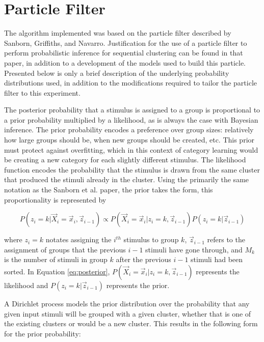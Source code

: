 \section*{Particle Filter}
The algorithm implemented was based on the particle filter described by Sanborn,
Griffiths, and Navarro\cite{sanborn2010}. Justification for the use of a
particle filter to perform probabilistic inference for sequential clustering can
be found in that paper, in addition to a development of the models used to build
this particle. Presented below is only a brief description of the underlying
probability distributions used, in addition to the modifications required to
tailor the particle filter to this experiment.

The posterior probability that a stimulus is assigned to a group is proportional
to a prior probability multiplied by a likelihood, as is always the case with
Bayesian inference. The prior probability encodes a preference over group sizes:
relatively how large groups should be, when new groups should be created, etc.
This prior must protect against overfitting, which in this context of category
learning would be creating a new category for each slightly different stimulus.
The likelihood function encodes the probability that the stimulus is drawn from
the same cluster that produced the stimuli already in the cluster. Using the
primarily the same notation as the Sanborn et al. paper, the prior takes the
form, this proportionality is represented by

\begin{equation}
P(z_i = k | \vec{X}_i = \vec{x}_i,  \vec{z}_{i-1}) \propto  P(\vec{X}_i =
\vec{x}_i | z_i = k,  \vec{z}_{i-1}) P(z_i = k | \vec{z}_{i-1})
\label{eq:posterior}
\end{equation}

where $z_i = k$ notates assigning the $i^{th}$ stimulus to group $k$, $\vec{z}_{i-1}$ refers to
the assignment of groups that the previous $i - 1$ stimuli have gone through,
and $M_k$ is the number of stimuli in group $k$ after the previous $i - 1$
stimuli had been sorted. In Equation \ref{eq:posterior}, $P(\vec{X}_i =
\vec{x}_i | z_i = k,  \vec{z}_{i-1})$ represents the likelihood and $P(z_i = k |
\vec{z}_{i-1})$ represents the prior.

A Dirichlet process models the prior distribution over the probability that
any given input stimuli will be grouped with a given cluster, whether that is one
of the existing clusters or would be a new cluster. This results in the
following form for the prior probability:

